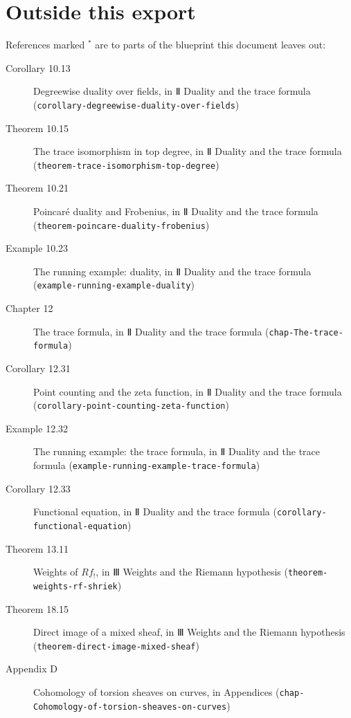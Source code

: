 \documentclass[11pt]{article}
\newcommand{\bpslug}[1]{\texttt{#1}}
\begin{document}
\section*{Outside this export}
References marked \ensuremath{{}^\ast} are to parts of the blueprint this document leaves out:
\begin{description}
\item[Corollary 10.13] Degreewise duality over fields, in Ⅱ Duality and the trace formula (\bpslug{corollary-{}\allowbreak{}degreewise-{}\allowbreak{}duality-{}\allowbreak{}over-{}\allowbreak{}fields})
\item[Theorem 10.15] The trace isomorphism in top degree, in Ⅱ Duality and the trace formula (\bpslug{theorem-{}\allowbreak{}trace-{}\allowbreak{}isomorphism-{}\allowbreak{}top-{}\allowbreak{}degree})
\item[Theorem 10.21] Poincaré duality and Frobenius, in Ⅱ Duality and the trace formula (\bpslug{theorem-{}\allowbreak{}poincare-{}\allowbreak{}duality-{}\allowbreak{}frobenius})
\item[Example 10.23] The running example: duality, in Ⅱ Duality and the trace formula (\bpslug{example-{}\allowbreak{}running-{}\allowbreak{}example-{}\allowbreak{}duality})
\item[Chapter 12] The trace formula, in Ⅱ Duality and the trace formula (\bpslug{chap-{}\allowbreak{}The-{}\allowbreak{}trace-{}\allowbreak{}formula})
\item[Corollary 12.31] Point counting and the zeta function, in Ⅱ Duality and the trace formula (\bpslug{corollary-{}\allowbreak{}point-{}\allowbreak{}counting-{}\allowbreak{}zeta-{}\allowbreak{}function})
\item[Example 12.32] The running example: the trace formula, in Ⅱ Duality and the trace formula (\bpslug{example-{}\allowbreak{}running-{}\allowbreak{}example-{}\allowbreak{}trace-{}\allowbreak{}formula})
\item[Corollary 12.33] Functional equation, in Ⅱ Duality and the trace formula (\bpslug{corollary-{}\allowbreak{}functional-{}\allowbreak{}equation})
\item[Theorem 13.11] Weights of $Rf_!$, in Ⅲ Weights and the Riemann hypothesis (\bpslug{theorem-{}\allowbreak{}weights-{}\allowbreak{}rf-{}\allowbreak{}shriek})
\item[Theorem 18.15] Direct image of a mixed sheaf, in Ⅲ Weights and the Riemann hypothesis (\bpslug{theorem-{}\allowbreak{}direct-{}\allowbreak{}image-{}\allowbreak{}mixed-{}\allowbreak{}sheaf})
\item[Appendix D] Cohomology of torsion sheaves on curves, in Appendices (\bpslug{chap-{}\allowbreak{}Cohomology-{}\allowbreak{}of-{}\allowbreak{}torsion-{}\allowbreak{}sheaves-{}\allowbreak{}on-{}\allowbreak{}curves})
\end{description}
\clearpage{}%
\end{document}
